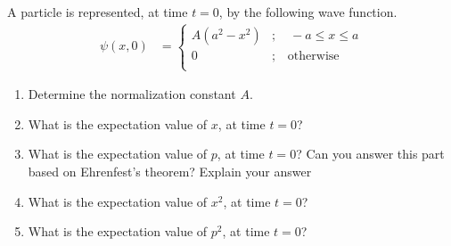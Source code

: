 \documentclass[fleqn, a4paper, 11pt, oneside]{amsart}
\theoremstyle{definition}
\theoremstyle{theorem}
\begin{document}
\begin{question}
	A particle is represented, at time $t = 0$, by the following wave function.
	\begin{align*}
		\psi(x,0) &=
			\begin{cases}
				A \left( a^2 - x^2 \right) &;\quad -a \le x \le a\\
				0 &;\quad \text{otherwise}\\
			\end{cases}
	\end{align*}
	\begin{enumerate}
		\item
			Determine the normalization constant $A$.
		\item
			What is the expectation value of $x$, at time $t = 0$?
		\item
			What is the expectation value of $p$, at time $t = 0$?
			Can you answer this part based on Ehrenfest's theorem?
			Explain your answer
		\item
			What is the expectation value of $x^2$, at time $t = 0$?
		\item
			What is the expectation value of $p^2$, at time $t = 0$?
	\end{enumerate}
\end{question}
\end{document}
